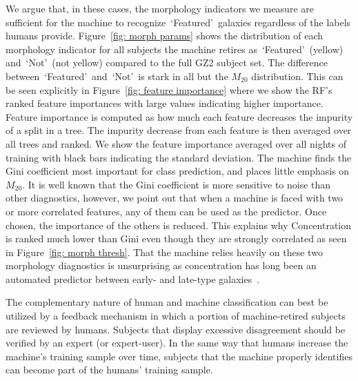 \documentclass[twocolumn]{aastex6}%
\newcommand{\M}[1]{$M_{\mathrm{#1}}$}
\newcommand{\feat}{`Featured'}
\newcommand{\notfeat}{`Not'}
\begin{document}
We argue that, in these cases, the morphology indicators we measure are 
sufficient for the machine to recognize~\feat~galaxies regardless of the labels humans provide. 
Figure~\ref{fig: morph params} shows the distribution of each 
morphology indicator for all subjects the machine retires as~\feat~(yellow) 
and~\notfeat~(not yellow) compared to the full GZ2 subject set. 
The difference between~\feat~and~\notfeat~is stark in all but the \M{20} distribution. 
This can be seen explicitly in Figure~\ref{fig:  feature importance} where
we show the RF's ranked feature importances with large values indicating higher importance. 
Feature importance is computed as how much each feature decreases the impurity 
of a split in a tree. The impurity decrease from each feature is then averaged over
all trees and ranked. 
We show the feature importance averaged over all nights of training with 
black bars indicating the standard deviation. The machine finds the Gini coefficient 
most important for class prediction, and places little emphasis on \M{20}. 
It is well known that the Gini coefficient is more sensitive to noise than other diagnostics, 
however, we point out that when a machine is faced with two or more correlated features, 
any of them can be used as the predictor. Once chosen, the importance of the others is reduced. 
This explains why Concentration is ranked much lower than Gini even though they 
are strongly correlated as seen in Figure~\ref{fig: morph thresh}. 
That the machine relies heavily on these two morphology diagnostics is unsurprising as
concentration has long been an automated predictor between early- and late-type galaxies~\citep{Abraham1994, Abraham1996, Shen2003}.


The complementary nature of human and machine classification can 
best be utilized by a feedback mechanism in which a portion of machine-retired
subjects are reviewed by humans. Subjects that display excessive disagreement
should be verified by an expert (or expert-user).  In the same way that 
humans increase the machine's training sample over time, subjects that the
machine properly identifies can become part of the humans' training sample. 



\end{document}

